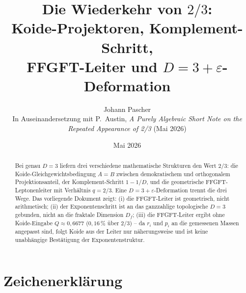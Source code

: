 
\title{Die Wiederkehr von \(2/3\):\\[0.4em]
\large Koide-Projektoren, Komplement-Schritt,\\
FFGFT-Leiter und \(D = 3+\varepsilon\)-Deformation}
\author{Johann Pascher\\[0.3em]
\small In Auseinandersetzung mit P.~Austin,
\textit{A Purely Algebraic Short Note on the Repeated Appearance of 2/3}
(Mai 2026)}
\date{Mai 2026}
\maketitle

\begin{abstract}
Bei genau \(D = 3\) liefern drei verschiedene mathematische Strukturen den
Wert \(2/3\): die Koide-Gleichgewichtsbedingung \(A = B\) zwischen
demokratischem und orthogonalem Projektionsanteil,
der Komplement-Schritt \(1 - 1/D\),
und die geometrische FFGFT-Leptonenleiter mit Verhältnis \(q = 2/3\).
Eine \(D = 3+\varepsilon\)-Deformation trennt die drei Wege.
Das vorliegende Dokument zeigt:
(i) die FFGFT-Leiter ist geometrisch, nicht arithmetisch;
(ii) der Exponentenschritt ist an das ganzzahlige topologische \(D=3\)
gebunden, nicht an die fraktale Dimension \(D_f\);
(iii) die FFGFT-Leiter ergibt ohne Koide-Eingabe \(Q \approx 0{,}6677\)
(\(0{,}16\,\%\) über \(2/3\)) --
da \(r_i\) und \(p_i\) an die gemessenen Massen angepasst sind, folgt Koide
aus der Leiter nur näherungsweise und ist keine unabhängige Bestätigung
der Exponentenstruktur.
\end{abstract}

\tableofcontents

\section*{Zeichenerklärung}

